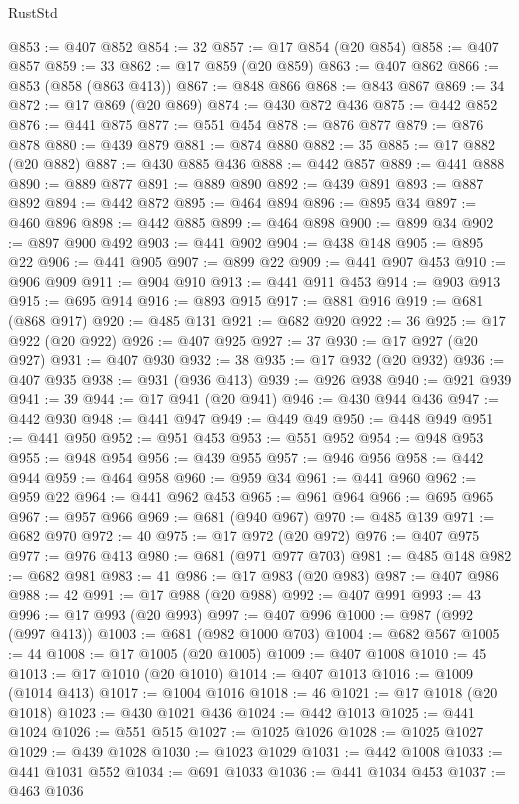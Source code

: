 \begin{lexlean}{RustStd}
\begin{coremodule}
{\begin{coremodule}
{{{{{{{{{{{{{{{{{{{{{{{{{{@853 := @407 @852
@854 := 32
@857 := @17 @854 (@20 @854)
@858 := @407 @857
@859 := 33
@862 := @17 @859 (@20 @859)
@863 := @407 @862
@866 := @853 (@858 (@863 @413))
@867 := @848 @866
@868 := @843 @867
@869 := 34
@872 := @17 @869 (@20 @869)
@874 := @430 @872 @436
@875 := @442 @852
@876 := @441 @875
@877 := @551 @454
@878 := @876 @877
@879 := @876 @878
@880 := @439 @879
@881 := @874 @880
@882 := 35
@885 := @17 @882 (@20 @882)
@887 := @430 @885 @436
@888 := @442 @857
@889 := @441 @888
@890 := @889 @877
@891 := @889 @890
@892 := @439 @891
@893 := @887 @892
@894 := @442 @872
@895 := @464 @894
@896 := @895 @34
@897 := @460 @896
@898 := @442 @885
@899 := @464 @898
@900 := @899 @34
@902 := @897 @900 @492
@903 := @441 @902
@904 := @438 @148
@905 := @895 @22
@906 := @441 @905
@907 := @899 @22
@909 := @441 @907 @453
@910 := @906 @909
@911 := @904 @910
@913 := @441 @911 @453
@914 := @903 @913
@915 := @695 @914
@916 := @893 @915
@917 := @881 @916
@919 := @681 (@868 @917)
@920 := @485 @131
@921 := @682 @920
@922 := 36
@925 := @17 @922 (@20 @922)
@926 := @407 @925
@927 := 37
@930 := @17 @927 (@20 @927)
@931 := @407 @930
@932 := 38
@935 := @17 @932 (@20 @932)
@936 := @407 @935
@938 := @931 (@936 @413)
@939 := @926 @938
@940 := @921 @939
@941 := 39
@944 := @17 @941 (@20 @941)
@946 := @430 @944 @436
@947 := @442 @930
@948 := @441 @947
@949 := @449 @49
@950 := @448 @949
@951 := @441 @950
@952 := @951 @453
@953 := @551 @952
@954 := @948 @953
@955 := @948 @954
@956 := @439 @955
@957 := @946 @956
@958 := @442 @944
@959 := @464 @958
@960 := @959 @34
@961 := @441 @960
@962 := @959 @22
@964 := @441 @962 @453
@965 := @961 @964
@966 := @695 @965
@967 := @957 @966
@969 := @681 (@940 @967)
@970 := @485 @139
@971 := @682 @970
@972 := 40
@975 := @17 @972 (@20 @972)
@976 := @407 @975
@977 := @976 @413
@980 := @681 (@971 @977 @703)
@981 := @485 @148
@982 := @682 @981
@983 := 41
@986 := @17 @983 (@20 @983)
@987 := @407 @986
@988 := 42
@991 := @17 @988 (@20 @988)
@992 := @407 @991
@993 := 43
@996 := @17 @993 (@20 @993)
@997 := @407 @996
@1000 := @987 (@992 (@997 @413))
@1003 := @681 (@982 @1000 @703)
@1004 := @682 @567
@1005 := 44
@1008 := @17 @1005 (@20 @1005)
@1009 := @407 @1008
@1010 := 45
@1013 := @17 @1010 (@20 @1010)
@1014 := @407 @1013
@1016 := @1009 (@1014 @413)
@1017 := @1004 @1016
@1018 := 46
@1021 := @17 @1018 (@20 @1018)
@1023 := @430 @1021 @436
@1024 := @442 @1013
@1025 := @441 @1024
@1026 := @551 @515
@1027 := @1025 @1026
@1028 := @1025 @1027
@1029 := @439 @1028
@1030 := @1023 @1029
@1031 := @442 @1008
@1033 := @441 @1031 @552
@1034 := @691 @1033
@1036 := @441 @1034 @453
@1037 := @463 @1036
}}}}}}}}}}}}}}}}}}}}}}}}}}
\end{coremodule}}
\end{coremodule}
\end{lexlean}
